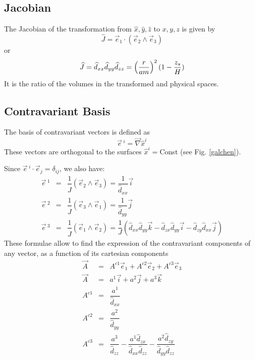\subsection{Jacobian}
The Jacobian of the transformation from $\widehat{x},\widehat{y},\widehat{z}$
to $x,y,z$ is given by
\begin{equation}
\widehat{J}  = \vec{e}_{1} \cdot ( \vec{e}_{2} \wedge  \vec{e}_{3})
\end{equation}
or
\begin{equation}
\widehat{J}  = \widehat{d}_{xx} \widehat{d}_{yy} \widehat{d}_{zz} = \left( {r\over am} \right)^2(1 - {z_s \over H})
\end{equation}
It is the ratio of the volumes in the transformed and physical spaces.

\subsection{Contravariant Basis}

The basis of contravariant vectors is defined as
\begin{equation}
\vec{e}\, ^{i} = \vec{\nabla}\widehat{x}^{i}
\end{equation}
These vectors are orthogonal to the surfaces $\widehat{x}^{i}=$Const (see Fig.
\ref{galchen}).

Since $\vec{e}\, ^{i} \cdot \vec{e} _{j} = \delta_{ij}$, we also have:
\begin{eqnarray}
\vec{e}\, ^{1} & = & \dfrac{1}{\widehat{J}}(\vec{e} _{2} \wedge \vec{e} _{3}) =
\dfrac{1}{\widehat{d}_{xx}} \vec{i}
\nonumber \\
\vec{e}\, ^{2} & = & \dfrac{1}{\widehat{J}}(\vec{e} _{3} \wedge \vec{e} _{1}) =
\dfrac{1}{\widehat{d}_{yy}} \vec{j}
\\
\vec{e}\, ^{3} & = & \dfrac{1}{\widehat{J}}(\vec{e} _{1} \wedge \vec{e} _{2}) =
\dfrac{1}{J}\left(\widehat{d}_{xx} \widehat{d}_{yy} \vec{k}- \widehat{d}_{zx} \widehat{d}_{yy}\vec{i}
 - \widehat{d}_{zy} \widehat{d}_{xx}\vec{j}\right) \nonumber
\end{eqnarray}
These formulae allow to find the expression of the contravariant components
of any vector, as a function of its cartesian components
\begin{eqnarray}
\vec{A} &=& A^{c1} \vec{e} _{1}+ A^{c2} \vec{e} _{2} + A^{c3} \vec{e} _{3}
\nonumber \\
\vec{A} &=& a^{1} \vec{i}+ a^{2} \vec{j} + a^{3} \vec{k} \nonumber \\
A^{c1}&  =& \dfrac{ a^1 }{\widehat{d}_{xx}} \\
A^{c2}&  =& \dfrac{ a^2 }{\widehat{d}_{yy}} \nonumber \\
A^{c3}&  =& \dfrac{ a^3 }{\widehat{d}_{zz}}- \dfrac{ a^1 \widehat{d}_{zx}}{\widehat{d}_{xx}\widehat{d}_{zz}}-
\dfrac{ a^2 \widehat{d}_{zy}}{\widehat{d}_{yy}\widehat{d}_{zz}} \nonumber
\end{eqnarray}

